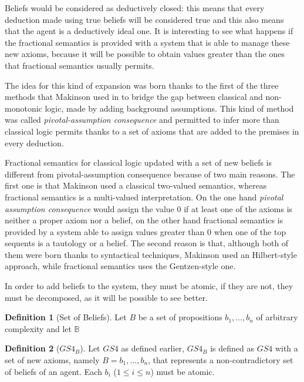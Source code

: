 \documentclass[a4paper, 12pt, oneside]{article}
\theoremstyle{plain}
\theoremstyle{definition}
\newtheorem{definition}{Definition}[section]
\newcommand{\numberset}{\mathbb}
\begin{document}
Beliefs would be considered as deductively closed: this means that every deduction made using true beliefs  will be considered true and this also means that the agent is a deductively ideal one. It is interesting to see what happens if the fractional semantics is provided with a system that is able to manage these new axioms, because it will be possible to obtain values greater than the ones that fractional semantics usually permits.

The idea for this kind of expansion was born thanks to the first of the three methods that Makinson used in \cite{mak:bridges} to bridge the gap between classical and non-monotonic logic, made by adding background assumptions. This kind of method was called \textit{pivotal-assumption consequence} and permitted to infer more than classical logic permits thanks to a set of axioms that are added to the premises in every deduction. 

Fractional semantics for classical logic updated with a set of new beliefs is different from pivotal-assumption consequence because of two main reasons. The first one is that Makinson used a classical two-valued semantics, whereas fractional semantics is a multi-valued interpretation. On the one hand \textit{pivotal assumption consequence} would assign the value 0 if at least one of the axioms is neither a proper axiom nor a belief, on the other hand fractional semantics is provided by a system able to assign  values greater than 0 when  one of the top sequents is a tautology or a belief. The second reason is that, although both of them were born thanks to syntactical techniques, Makinson used an Hilbert-style approach, while fractional semantics uses the  Gentzen-style one.

In order to add beliefs to the system, they must be atomic, if they are not, they must be decomposed, as it will be possible to see better.

\begin{definition}[Set of Beliefs]  

Let $B$ be a set of propositions $b_1, \dots ,b_n$ of arbitrary complexity and let $\numberset{B}$ 

\end{definition}

\begin{definition}[$GS4_B$]
	
	Let $GS4$ as defined earlier, $GS4_B$ is defined as $GS4$ with a set of new axioms, namely $B = b_1, \dots ,b_n$, that represents a non-contradictory set of beliefs of an agent. Each $b_i$ ($1\leq i\leq n$) must be atomic.
	
\end{definition}
\end{document}
